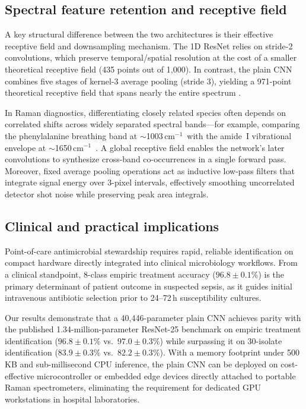 \documentclass[journal,onecolumn]{IEEEtran}
\newcommand{\wn}{\,cm$^{-1}$}              %
\begin{document}
\subsection{Spectral feature retention and receptive field}
\label{sec:disc-features}
A key structural difference between the two architectures is their effective
receptive field and downsampling mechanism. The 1D ResNet relies on stride-2
convolutions, which preserve temporal/spatial resolution at the cost of a smaller
theoretical receptive field (435 points out of 1{,}000). In contrast, the plain
CNN combines five stages of kernel-3 average pooling (stride 3), yielding a
971-point theoretical receptive field that spans nearly the entire spectrum
\cite{luo2016understanding}.

In Raman diagnostics, differentiating closely related species often depends on
correlated shifts across widely separated spectral bands---for example, comparing
the phenylalanine breathing band at $\sim$1003\wn\ with the amide~I vibrational
envelope at $\sim$1650\wn\ \cite{movasaghi2007raman}. A global receptive field enables the network's later
convolutions to synthesize cross-band co-occurrences in a single forward pass.
Moreover, fixed average pooling operations act as inductive low-pass filters that
integrate signal energy over 3-pixel intervals, effectively smoothing uncorrelated
detector shot noise while preserving peak area integrals.

\subsection{Clinical and practical implications}
\label{sec:disc-clinical}
Point-of-care antimicrobial stewardship requires rapid, reliable identification
on compact hardware directly integrated into clinical microbiology workflows.
From a clinical standpoint, 8-class empiric treatment accuracy ($96.8 \pm 0.1\%$) is the
primary determinant of patient outcome in suspected sepsis, as it guides initial
intravenous antibiotic selection prior to 24--72\,h susceptibility cultures.

Our results demonstrate that a 40{,}446-parameter plain CNN achieves parity with
the published 1.34-million-parameter ResNet-25 benchmark on empiric treatment
identification ($96.8 \pm 0.1\%$ vs.\ $97.0 \pm 0.3\%$) while surpassing it on
30-isolate identification ($83.9 \pm 0.3\%$ vs.\ $82.2 \pm 0.3\%$). With a memory
footprint under 500\,KB and sub-millisecond CPU inference, the plain CNN can be
deployed on cost-effective microcontroller or embedded edge devices directly
attached to portable Raman spectrometers, eliminating the requirement for
dedicated GPU workstations in hospital laboratories.
\end{document}
